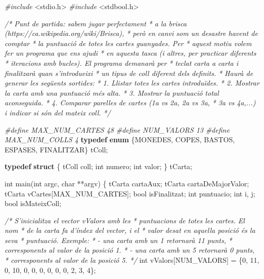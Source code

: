 \documentclass[]{book}
\newenvironment{Shaded}{\begin{snugshade}}{\end{snugshade}}
\newcommand{\KeywordTok}[1]{\textcolor[rgb]{0.13,0.29,0.53}{\textbf{#1}}}
\newcommand{\DataTypeTok}[1]{\textcolor[rgb]{0.13,0.29,0.53}{#1}}
\newcommand{\DecValTok}[1]{\textcolor[rgb]{0.00,0.00,0.81}{#1}}
\newcommand{\ImportTok}[1]{#1}
\newcommand{\CommentTok}[1]{\textcolor[rgb]{0.56,0.35,0.01}{\textit{#1}}}
\newcommand{\PreprocessorTok}[1]{\textcolor[rgb]{0.56,0.35,0.01}{\textit{#1}}}
\newcommand{\NormalTok}[1]{#1}
\begin{document}
\begin{Shaded}
\begin{Highlighting}[]
\PreprocessorTok{#include }\ImportTok{<stdio.h>}
\PreprocessorTok{#include }\ImportTok{<stdbool.h>}

\CommentTok{/* Punt de partida: sabem jugar perfectament}
\CommentTok{ * a la brisca (https://ca.wikipedia.org/wiki/Brisca), }
\CommentTok{ * però en canvi som un desastre havent de comptar}
\CommentTok{ * la puntuació de totes les cartes guanyades. Per}
\CommentTok{ * aquest motiu volem fer un programa que ens ajudi}
\CommentTok{ * en aquesta tasca (i altres, per practicar diferents}
\CommentTok{ * iteracions amb bucles). El programa demanarà per }
\CommentTok{ * teclat carta a carta i finalitzarà quan s'introdueixi}
\CommentTok{ * un tipus de coll diferent dels definits.}
\CommentTok{ * Haurà de generar les següents sortides:}
\CommentTok{ * 1. Llistar totes les cartes introduïdes.}
\CommentTok{ * 2. Mostrar la carta amb una puntuació més alta.}
\CommentTok{ * 3. Mostrar la puntuació total aconseguida.}
\CommentTok{ * 4. Comparar parelles de cartes (1a vs 2a, 2a vs 3a,}
\CommentTok{ *    3a vs 4a,...) i indicar si són del mateix coll.}
\CommentTok{ */}

\PreprocessorTok{#define MAX_NUM_CARTES 48}
\PreprocessorTok{#define NUM_VALORS 13}
\PreprocessorTok{#define MAX_NUM_COLLS 4}
\KeywordTok{typedef} \KeywordTok{enum}\NormalTok{ \{MONEDES, COPES, BASTOS, ESPASES, FINALITZAR\} tColl;}

\KeywordTok{typedef} \KeywordTok{struct}\NormalTok{ \{}
\NormalTok{    tColl coll;}
    \DataTypeTok{int}\NormalTok{ numero;}
    \DataTypeTok{int}\NormalTok{ valor;}
\NormalTok{\} tCarta;}

\DataTypeTok{int}\NormalTok{ main(}\DataTypeTok{int}\NormalTok{ argc, }\DataTypeTok{char}\NormalTok{ **argv) \{}
\NormalTok{    tCarta cartaAux;}
\NormalTok{    tCarta cartaDeMajorValor;}
\NormalTok{    tCarta vCartes[MAX_NUM_CARTES];}
\NormalTok{    bool isFinalitzat;}
    \DataTypeTok{int}\NormalTok{ puntuacio;}
    \DataTypeTok{int}\NormalTok{ i, j;}
\NormalTok{    bool isMateixColl;}
    
    \CommentTok{/* S'inicialitza el vector vValors amb les}
\CommentTok{     * puntuacions de totes les cartes. El nom}
\CommentTok{     * de la carta fa d'índex del vector, i el}
\CommentTok{     * valor desat en aquella posició és la seva}
\CommentTok{     * puntuació. Exemple: }
\CommentTok{     * - una carta amb un 1 retornarà 11 punts,}
\CommentTok{     *   corresponents al valor de la posició 1.}
\CommentTok{     * - una carta amb un 5 retornarà 0 punts,}
\CommentTok{     *   corresponents al valor de la posició 5.}
\CommentTok{     */}
    \DataTypeTok{int}\NormalTok{ vValors[NUM_VALORS] = \{}\DecValTok{0}\NormalTok{, }\DecValTok{11}\NormalTok{, }\DecValTok{0}\NormalTok{, }\DecValTok{10}\NormalTok{, }\DecValTok{0}\NormalTok{, }\DecValTok{0}\NormalTok{, }\DecValTok{0}\NormalTok{, }\DecValTok{0}\NormalTok{, }\DecValTok{0}\NormalTok{, }\DecValTok{0}\NormalTok{, }\DecValTok{2}\NormalTok{, }\DecValTok{3}\NormalTok{, }\DecValTok{4}\NormalTok{\};}


\end{Highlighting}
\end{Shaded}
\end{document}
